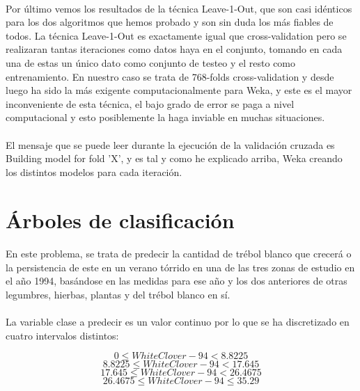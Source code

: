 \documentclass[es]{ifirak}
\begin{document}
\paragraph{}
Por último vemos los resultados de la técnica Leave-1-Out, que son casi idénticos para los dos algoritmos que hemos probado y son sin duda los más fiables de todos. 
La técnica Leave-1-Out es exactamente igual que cross-validation pero se realizaran tantas iteraciones como datos haya en el conjunto, tomando en cada una de estas un único dato como conjunto de testeo y el resto como entrenamiento. En nuestro caso se trata de 768-folds cross-validation y desde luego ha sido la más exigente computacionalmente para Weka, y este es el mayor inconveniente de esta técnica, el bajo grado de error se paga a nivel computacional y esto posiblemente la haga inviable en muchas situaciones.
\paragraph{}
El mensaje que se puede leer durante la ejecución de la validación cruzada es Building model for fold 'X', y es tal y como he explicado arriba, Weka creando los distintos modelos para cada iteración.

\section{Árboles de clasificación }

\paragraph{}
En este problema, se trata de predecir la cantidad de trébol blanco que crecerá o la persistencia de este en un verano tórrido en una de las tres zonas de estudio en el año 1994, basándose en las medidas para ese año y los dos anteriores de otras legumbres, hierbas, plantas y del trébol blanco en sí.
\paragraph{}
La variable clase a predecir es un valor continuo por lo que se ha discretizado en cuatro intervalos distintos:

\begin{displaymath}
   0\leq WhiteClover-94<8.8225 	
\end{displaymath}
\begin{displaymath}
  8.8225\leq WhiteClover-94<17.645  	
\end{displaymath}
\begin{displaymath}
 17.645\leq WhiteClover-94<26.4675 
\end{displaymath}
\begin{displaymath}
26.4675\leq WhiteClover-94\leq 35.29 
\end{displaymath}
\end{document}
